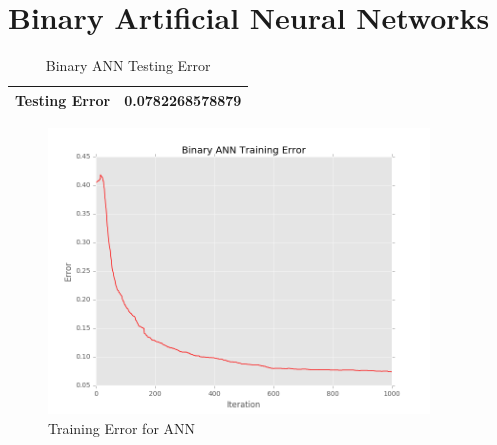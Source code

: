 \documentclass[12pt]{article}
\begin{document}
\maketitle

\section{Binary Artificial Neural Networks}\label{Binary ANN}
\begin{table}[h]
\begin{center}
\begin{tabular}{|l|l|}
\hline
Testing Error & 0.0782268578879\\
\hline
\end{tabular}
\caption{Binary ANN Testing Error}
\end{center}
\end{table}

\begin{figure}[H]
\begin{center}
\includegraphics[width=0.9\textwidth]{binary_ann_training_errors.png}
\caption{Training Error for ANN}
\end{center}
\end{figure}

\newpage
\end{document}
